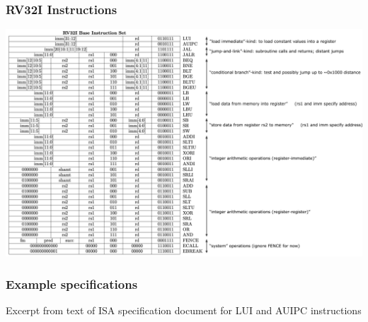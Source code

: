 
\begin{frame}
\frametitle{RV32I Instructions}

\begin{center}
\includegraphics[height=0.85\textheight]{../Figures/Fig_RV32I_labeled}
\end{center}

\end{frame}


\begin{frame}
\frametitle{Example specifications}

Excerpt from text of ISA specification document for LUI and AUIPC instructions

\begin{center}
\end{center}

\end{frame}

